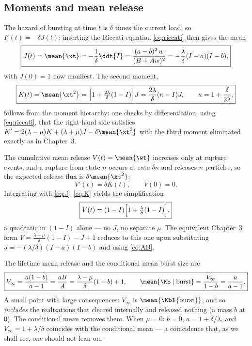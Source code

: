 \subsection{Moments and mean release}
\label{sec:moments-recap}

The hazard of bursting at time $t$ is $\delta$ times the current load, so
$I'(t)=-\delta J(t)$; inserting the Riccati equation \eqref{eq:riccati}
then gives the mean
\begin{equation}
\boxed{J(t)=\mean{\xt}=-\frac{1}{\delta}\ddt{I}
=\frac{(a-b)^2\,w}{(B+Aw)^2}
=-\frac{\lambda}{\delta}(I-a)(I-b),}
\label{eq:J}
\end{equation}
with $J(0)=1$ now manifest. The second moment,
\begin{equation}
\boxed{K(t)=\mean{\xt^2}=\Bigl[1+\tfrac{2\lambda}{\delta}(1-I)\Bigr]J
=\frac{2\lambda}{\delta}(\kappa-I)J,\qquad \kappa=1+\frac{\delta}{2\lambda},}
\label{eq:K}
\end{equation}
follows from the moment hierarchy: one checks by differentiation, using
\eqref{eq:riccati}, that the right-hand side satisfies
$K'=2(\lambda-\mu)K+(\lambda+\mu)J-\delta\mean{\xt^3}$ with the third moment
eliminated exactly as in Chapter~3.

The cumulative mean release $V(t)=\mean{\wt}$ increases only at rupture
events, and a rupture from state $n$ occurs at rate $\delta n$ and releases
$n$ particles, so the expected release flux is $\delta\mean{\xt^2}$:
\begin{equation}
V'(t)=\delta K(t),\qquad V(0)=0.
\end{equation}
Integrating with \eqref{eq:J}--\eqref{eq:K} yields the simplification
\begin{equation}
\boxed{V(t)=(1-I)\Bigl[1+\tfrac{\lambda}{\delta}(1-I)\Bigr],}
\label{eq:V}
\end{equation}
a quadratic in $(1-I)$ alone --- no $J$, no separate $\mu$. The equivalent
Chapter~3 form $V=\frac{\lambda-\mu}{\delta}(1-I)-J+1$ reduces to this one
upon substituting $J=-(\lambda/\delta)(I-a)(I-b)$ and using \eqref{eq:AB}.

The lifetime mean release and the conditional mean burst size are
\begin{equation}
\boxed{V_\infty=\frac{a(1-b)}{a-1}=\frac{aB}{A}
=\frac{\lambda-\mu}{\delta}(1-b)+1,
\qquad
\mean{\Kb\mid\text{burst}}=\frac{V_\infty}{1-b}=\frac{a}{a-1}.}
\label{eq:Vinf}
\end{equation}
A small point with large consequences: $V_\infty$ is
$\mean{\Kb\mathbf 1\{\text{burst}\}}$, and so \emph{includes} the
realisations that cleared internally and released nothing (a mass $b$ at
$0$). The conditional mean removes them. When $\mu=0$: $b=0$,
$a=1+\delta/\lambda$, and $V_\infty=1+\lambda/\delta$ coincides with the
conditional mean --- a coincidence that, as we shall see, one should not
lean on.

